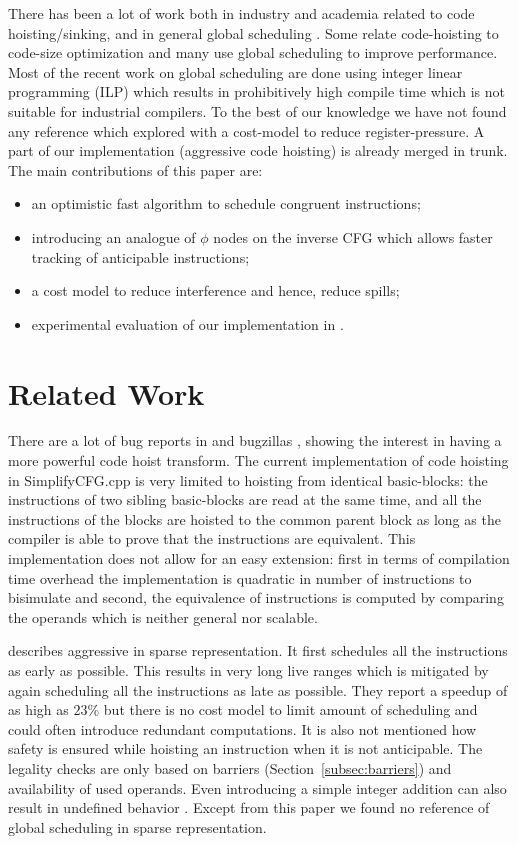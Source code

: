 \documentclass[sigplan,10pt,review,anonymous]{acmart}\settopmatter{printfolios=true,printccs=false,printacmref=false}
\begin{document}
There has been a lot of work both in industry and academia related to code
hoisting/sinking, and in general global scheduling \cite{click1995global}. Some
relate code-hoisting to code-size optimization \cite{rosen1988global} and many
\cite{barany2013, shobaki2013} use global scheduling to improve
performance. Most of the recent work on global scheduling are done using integer
linear programming (ILP) which results in prohibitively high compile time which
is not suitable for industrial compilers. To the best of our knowledge we have
not found any reference which explored \gcm{} with a cost-model to reduce
register-pressure. A part of our implementation (aggressive code hoisting) is
already merged in \LLVM{} trunk. The main contributions of this paper are:
\begin{itemize}[leftmargin=*,topsep=0pt]
\item an optimistic fast algorithm to schedule congruent instructions;
\item introducing an analogue of $\phi$ nodes on the inverse CFG which allows
  faster tracking of anticipable instructions;
\item a cost model to reduce interference and hence, reduce spills;
\item experimental evaluation of our implementation in \LLVM{}.
\end{itemize}

\section{Related Work}

There are a lot of bug reports in \GCC{} and \LLVM{} bugzillas
\cite{GCCCodeHoistingBugs, LLVMCodeHoistingBugs}, showing the interest in having
a more powerful code hoist transform.  The current \LLVM{} implementation of
code hoisting in SimplifyCFG.cpp is very limited to hoisting from identical
basic-blocks: the instructions of two sibling basic-blocks are read at the same
time, and all the instructions of the blocks are hoisted to the common parent
block as long as the compiler is able to prove that the instructions are
equivalent.  This implementation does not allow for an easy extension: first in
terms of compilation time overhead the implementation is quadratic in number of
instructions to bisimulate and second, the equivalence of instructions is
computed by comparing the operands which is neither general nor scalable.

\citet{click1995global} describes aggressive \gcm{} in sparse representation. It
first schedules all the instructions as early as possible. This results in very
long live ranges which is mitigated by again scheduling all the instructions as
late as possible. They report a speedup of as high as $23\%$ but there is no
cost model to limit amount of scheduling and could often introduce redundant
computations. It is also not mentioned how safety is ensured while hoisting an
instruction when it is not anticipable. The legality checks are only based on
barriers (Section~\ref{subsec:barriers}) and availability of used operands. Even
introducing a simple integer addition can also result in undefined behavior
\cite{undef}.  Except from this paper we found no reference of global scheduling
in sparse representation.
\end{document}
